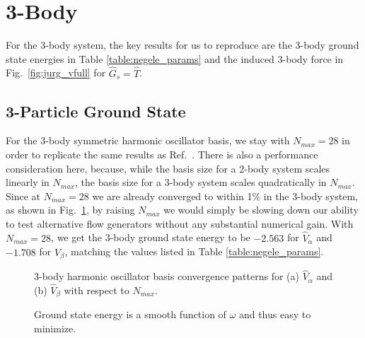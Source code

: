 \section{3-Body}

For the 3-body system, the key results for us to reproduce are the 3-body ground state energies in Table \ref{table:negele_params} and the induced 3-body force in Fig.~\ref{fig:jurg_vfull} for $\hat{G}_s=\hat{T}$.

\subsection{3-Particle Ground State}

For the 3-body symmetric harmonic oscillator basis, we stay with $N_{max}=28$ in order to replicate the same results as Ref.~\cite{Jurgenson:2008jp}. There is also a performance consideration here, because, while the basis size for a 2-body system scales linearly in $N_{max}$, the basis size for a 3-body system scales quadratically in $N_{max}$. Since at $N_{max}=28$ we are already converged to within 1\% in the 3-body system, as shown in Fig.~\ref{fig:3body_nmax}, by raising $N_{max}$ we would simply be slowing down our ability to test alternative flow generators without any substantial numerical gain. With $N_{max}=28$, we get the 3-body ground state energy to be $-2.563$ for $\hat{V}_\alpha$ and $-1.708$ for $\hat{V}_\beta$, matching the values listed in Table \ref{table:negele_params}.

\begin{figure}[th!]
\begin{center}
\end{center}
\caption{3-body harmonic oscillator basis convergence patterns for (a) $\hat{V}_\alpha$ and (b) $\hat{V}_\beta$ with respect to $N_{max}$.}
\label{fig:3body_nmax}
\end{figure}
\begin{figure}[th!]
\begin{center}
\end{center}
\caption{Ground state energy is a smooth function of $\omega$ and thus easy to minimize.}
\label{fig:alpha_w}
\end{figure}


